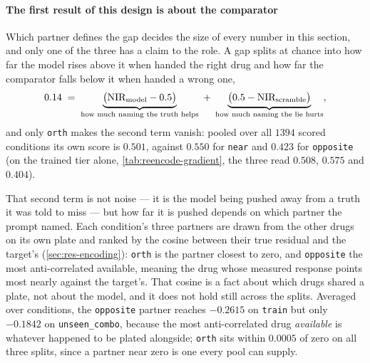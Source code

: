 \paragraph{The first result of this design is about the comparator} Which partner
defines the gap decides the size of every number in this section, and only one of
the three has a claim to the role. A gap splits at chance into how far the model
rises above it when handed the right drug and how far the comparator falls below
it when handed a wrong one,
\begin{equation}
 0.14 \;=\; \underbrace{\big(\textrm{NIR}_{\textrm{model}} - 0.5\big)}_{\textrm{how much naming the truth helps}}
 \;+\; \underbrace{\big(0.5 - \textrm{NIR}_{\textrm{scramble}}\big)}_{\textrm{how much naming the lie hurts}},
\end{equation}
and only \texttt{orth} makes the second term vanish: pooled over all $\num{1394}$ scored conditions its own score is $0.501$, against $0.550$ for \texttt{near} and $0.423$ for \texttt{opposite} (on the trained tier alone, \cref{tab:reencode-gradient}, the three read $0.508$, $0.575$ and $0.404$).

That second term is not noise --- it is the model being pushed away from a truth
it was told to miss --- but how far it is pushed depends on which partner the
prompt named. Each condition's three partners are drawn from the other drugs on
its own plate and ranked by the cosine between their true residual and the
target's (\cref{sec:res-encoding}): \texttt{orth} is the partner closest to zero,
and \texttt{opposite} the most anti-correlated available, meaning the drug whose
measured response points most nearly against the target's. That cosine is a fact
about which drugs shared a plate, not about the model, and it does not hold still
across the splits. Averaged over conditions, the \texttt{opposite} partner reaches
$-0.2615$ on \texttt{train} but only $-0.1842$ on \texttt{unseen\_combo}, because
the most anti-correlated drug \emph{available} is whatever happened to be plated
alongside; \texttt{orth} sits within $0.0005$ of zero on all three splits, since a
partner near zero is one every pool can supply.

